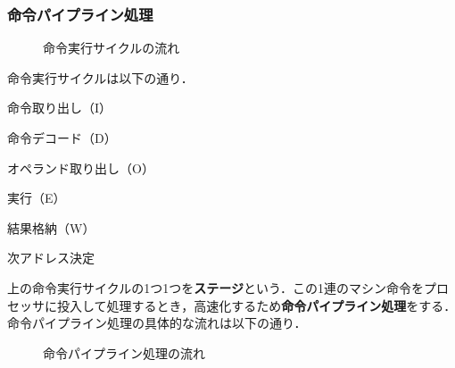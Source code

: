 \subsubsection{命令パイプライン処理}

\begin{figure}[H]
	\begin{center}
		\caption{命令実行サイクルの流れ}
		\label{fig14-2}
	\end{center}
\end{figure}

命令実行サイクルは以下の通り．

\begin{enumerate}[label=\textbf{[\arabic*]}, labelsep=10pt, leftmargin=23pt]
	\item 命令取り出し（I）
	\item 命令デコード（D）
	\item オペランド取り出し（O）
	\item 実行（E）
	\item 結果格納（W）
	\item 次アドレス決定
\end{enumerate}

上の命令実行サイクルの1つ1つを\textbf{ステージ}という．この1連のマシン命令をプロセッサに投入して処理するとき，高速化するため\textbf{命令パイプライン処理}をする．命令パイプライン処理の具体的な流れは以下の通り．

\begin{figure}[H]
	\begin{center}
		\caption{命令パイプライン処理の流れ}
		\label{fig14-3}
	\end{center}
\end{figure}

